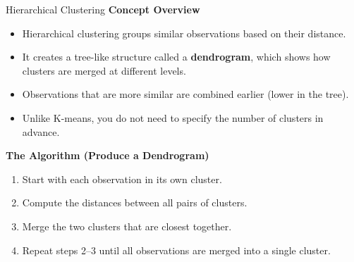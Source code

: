 \documentclass[aspectratio=169,xcolor=dvipsnames]{beamer}
\begin{document}
\begin{frame}{Hierarchical Clustering}
  \textbf{Concept Overview}
  \begin{itemize}
    \item Hierarchical clustering groups similar observations based on their distance.
    \item It creates a tree-like structure called a \textbf{dendrogram}, which shows how clusters are merged at different levels.
    \item Observations that are more similar are combined earlier (lower in the tree).
    \item Unlike K-means, you do not need to specify the number of clusters in advance.
  \end{itemize}

  \vspace{0.4cm}
  \textbf{The Algorithm (Produce a Dendrogram)}
  \begin{enumerate}
    \item Start with each observation in its own cluster.
    \item Compute the distances between all pairs of clusters.
    \item Merge the two clusters that are closest together.
    \item Repeat steps 2–3 until all observations are merged into a single cluster.
  \end{enumerate}
\end{frame}
\end{document}
